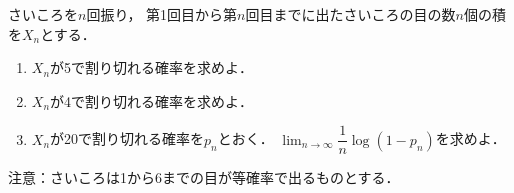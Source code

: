 \documentclass[../../main.tex]{subfiles}
\begin{document}
さいころを$n$回振り，
第1回目から第$n$回目までに出たさいころの目の数$n$個の積を$X_n$とする．
\begin{enumerate}
  \item $X_n$が5で割り切れる確率を求めよ．
  \item $X_n$が4で割り切れる確率を求めよ．
  \item $X_n$が20で割り切れる確率を$p_n$とおく．
    $\displaystyle\lim_{n\to\infty}\dfrac{1}{n}\log(1-p_n)$を求めよ．
\end{enumerate}
注意：さいころは1から6までの目が等確率で出るものとする．
\end{document}
